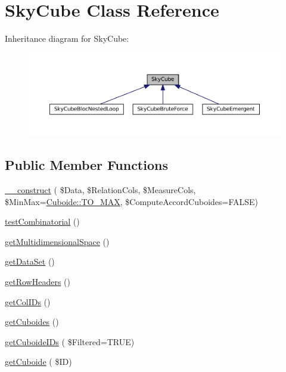 \hypertarget{class_sky_cube}{}\section{Sky\+Cube Class Reference}
\label{class_sky_cube}


Inheritance diagram for Sky\+Cube\+:\nopagebreak
\begin{figure}[H]
\begin{center}
\leavevmode
\includegraphics[width=350pt]{class_sky_cube__inherit__graph}
\end{center}
\end{figure}
\subsection*{Public Member Functions}
\begin{DoxyCompactItemize}
\item 
\hyperlink{class_sky_cube_aa93aeacd5389ce08890582667e987c65}{\+\_\+\+\_\+construct} ( \$Data, \$Relation\+Cols, \$Measure\+Cols, \$Min\+Max=\hyperlink{class_cuboide_afd49ea48fafb0362d27f78f6f4ef8b84}{Cuboide\+::\+T\+O\+\_\+\+M\+AX}, \$Compute\+Accord\+Cuboides=F\+A\+L\+SE)
\item 
\hyperlink{class_sky_cube_a315d9eb3672b81c5091139db449dd0ac}{test\+Combinatorial} ()
\item 
\hyperlink{class_sky_cube_ad6426ecd7f39e86656afa4de4db347b5}{get\+Multidimensional\+Space} ()
\item 
\hyperlink{class_sky_cube_a3627e6be0bf4eb22fde5a7d422ec60d1}{get\+Data\+Set} ()
\item 
\hyperlink{class_sky_cube_a8fe81d998c875dbd6921b709f9d464d6}{get\+Row\+Headers} ()
\item 
\hyperlink{class_sky_cube_a4b5698250b2e467731f8d3c6a49e04a9}{get\+Col\+I\+Ds} ()
\item 
\hyperlink{class_sky_cube_aabad14a4963a4b7f890e5e7abcb5f67b}{get\+Cuboides} ()
\item 
\hyperlink{class_sky_cube_ad23b0dcc8513aaa0ce95fee26dfbee0e}{get\+Cuboide\+I\+Ds} ( \$Filtered=T\+R\+UE)
\item 
\hyperlink{class_sky_cube_a18c6b3ec100eb483e941b8bb69c40187}{get\+Cuboide} ( \$ID)
\end{DoxyCompactItemize}
